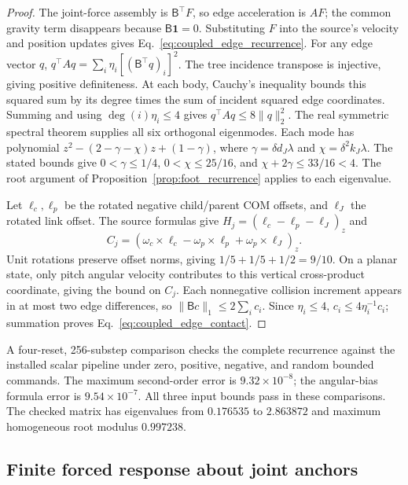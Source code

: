 \begin{proof}
The joint-force assembly is $\mathsf B^\top F$, so edge acceleration is $AF$; the common gravity term disappears because $\mathsf B\mathbf1=0$.
Substituting $F$ into the source's velocity and position updates gives Eq.~\eqref{eq:coupled_edge_recurrence}.
For any edge vector $q$, $q^\top Aq=\sum_i\eta_i[(\mathsf B^\top q)_i]^2$.
The tree incidence transpose is injective, giving positive definiteness.
At each body, Cauchy's inequality bounds this squared sum by its degree times the sum of incident squared edge coordinates.
Summing and using $\deg(i)\eta_i\le4$ gives $q^\top Aq\le8\|q\|_2^2$.
The real symmetric spectral theorem supplies all six orthogonal eigenmodes.
Each mode has polynomial $z^2-(2-\gamma-\chi)z+(1-\gamma)$, where $\gamma=\delta d_J\lambda$ and $\chi=\delta^2k_J\lambda$.
The stated bounds give $0<\gamma\le1/4$, $0<\chi\le25/16$, and $\chi+2\gamma\le33/16<4$.
The root argument of Proposition~\ref{prop:foot_recurrence} applies to each eigenvalue.

Let $\ell_c,\ell_p$ be the rotated negative child/parent COM offsets, and $\ell_J$ the rotated link offset.
The source formulas give $H_j=(\ell_c-\ell_p-\ell_J)_z$ and
\begin{equation}
 C_j=(\omega_c\times\ell_c-\omega_p\times\ell_p+\omega_p\times\ell_J)_z.
\end{equation}
Unit rotations preserve offset norms, giving $1/5+1/5+1/2=9/10$.
On a planar state, only pitch angular velocity contributes to this vertical cross-product coordinate, giving the bound on $C_j$.
Each nonnegative collision increment appears in at most two edge differences, so $\|\mathsf Bc\|_1\le2\sum_i c_i$.
Since $\eta_i\le4$, $c_i\le4\eta_i^{-1}c_i$; summation proves Eq.~\eqref{eq:coupled_edge_contact}.
\end{proof}

A four-reset, 256-substep comparison checks the complete recurrence against the installed scalar pipeline under zero, positive, negative, and random bounded commands.
The maximum second-order error is $9.32\times10^{-8}$; the angular-bias formula error is $9.54\times10^{-7}$.
All three input bounds pass in these comparisons.
The checked matrix has eigenvalues from $0.176535$ to $2.863872$ and maximum homogeneous root modulus $0.997238$.

\subsection{Finite forced response about joint anchors}
\label{app:forced_response}

